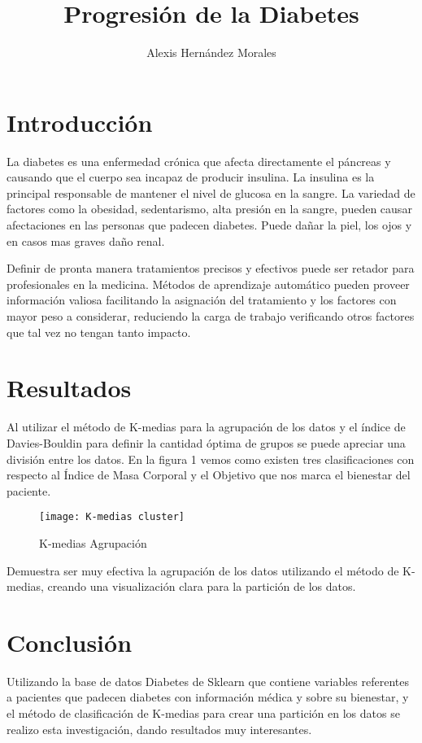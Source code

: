 \documentclass{article}
\title{Progresión de la Diabetes}
\author{Alexis Hernández Morales}
\affil{Facultad de Ciencias Físico Matemáticas, Universidad Autónoma de Nuevo León, San Nicolás de los Garza, México.}
\date{}
\begin{document}
\maketitle

\section{Introducción}
La diabetes es una enfermedad crónica que afecta directamente el páncreas y causando que el cuerpo sea incapaz de producir insulina. La insulina es la principal responsable de mantener el nivel de glucosa en la sangre. La variedad de factores como la obesidad, sedentarismo, alta presión en la sangre, pueden causar afectaciones en las personas que padecen diabetes. Puede dañar la piel, los ojos y en casos mas graves daño renal.

Definir de pronta manera tratamientos precisos y efectivos puede ser retador para profesionales en la medicina. Métodos de aprendizaje automático pueden proveer información valiosa facilitando la asignación del tratamiento y los factores con mayor peso a considerar, reduciendo la carga de trabajo verificando otros factores que tal vez no tengan tanto impacto.

\section{Resultados}
Al utilizar el método de K-medias para la agrupación de los datos y el índice de Davies-Bouldin para definir la cantidad óptima de grupos se puede apreciar una división entre los datos. En la figura 1 vemos como existen tres clasificaciones con respecto al Índice de Masa Corporal y el Objetivo que nos marca el bienestar del paciente.

\begin{figure}[h!]
\centering
\texttt{[image: K-medias cluster]}
\caption{K-medias Agrupación}
\label{fig:cluster}
\end{figure}

Demuestra ser muy efectiva la agrupación de los datos utilizando el método de K-medias, creando una visualización clara para la partición de los datos.


\section{Conclusión}
 Utilizando la base de datos Diabetes de Sklearn que contiene variables referentes a pacientes que padecen diabetes con información médica y sobre su bienestar, y el método de clasificación de K-medias para crear una partición en los datos se realizo esta investigación, dando resultados muy interesantes.
\end{document}
